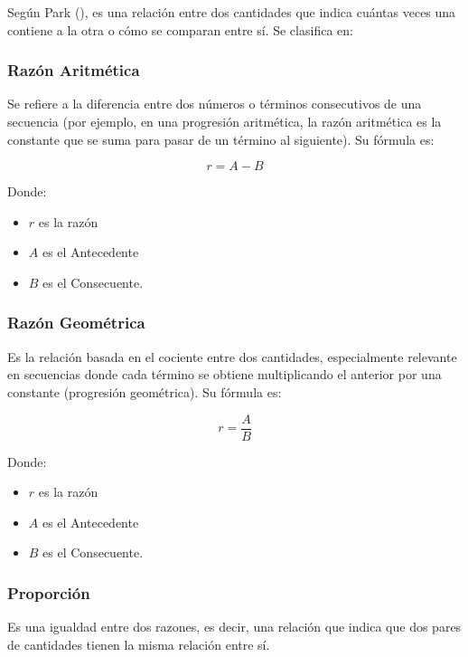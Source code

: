 \documentclass[
  stu,
  floatsintext,
  longtable,
  a4paper,
  nolmodern,
  notxfonts,
  notimes,
  colorlinks=true,linkcolor=blue,citecolor=blue,urlcolor=blue]{apa7}
\begin{document}
Según Park (),
es una relación entre dos cantidades que indica cuántas veces una
contiene a la otra o cómo se comparan entre sí. Se clasifica en:

\subsubsection{Razón Aritmética}\label{razuxf3n-aritmuxe9tica}

Se refiere a la diferencia entre dos números o términos consecutivos de
una secuencia (por ejemplo, en una progresión aritmética, la razón
aritmética es la constante que se suma para pasar de un término al
siguiente). Su fórmula es:

\[
  r = A - B
  \]

Donde:

\begin{itemize}
\item
  \(r\) es la razón
\item
  \(A\) es el Antecedente
\item
  \(B\) es el Consecuente.
\end{itemize}

\subsubsection{Razón Geométrica}\label{razuxf3n-geomuxe9trica}

Es la relación basada en el cociente entre dos cantidades, especialmente
relevante en secuencias donde cada término se obtiene multiplicando el
anterior por una constante (progresión geométrica). Su fórmula es:

\[
r = \frac{A}{B}
\]

Donde:

\begin{itemize}
\item
  \(r\) es la razón
\item
  \(A\) es el Antecedente
\item
  \(B\) es el Consecuente.
\end{itemize}

\subsubsection{Proporción}\label{proporciuxf3n}

Es una igualdad entre dos razones, es decir, una relación que indica que
dos pares de cantidades tienen la misma relación entre sí.
\end{document}
